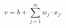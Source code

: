\begin{equation}
v = b + \sum_{j = 1}^{m}{w_j \cdot x_j}.
 \label{eq:inducedlocalfield}
\end{equation}
